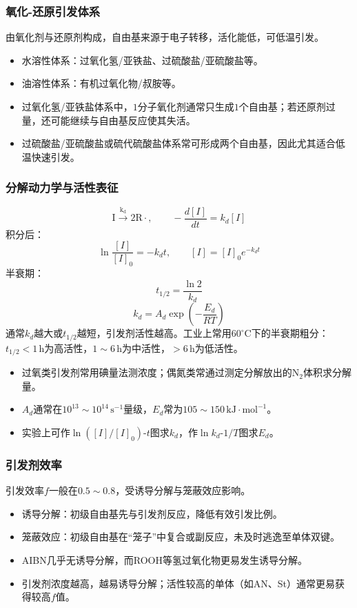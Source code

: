 ﻿\documentclass[12pt,a4paper]{article}
\begin{document}
\subsubsection{氧化-还原引发体系}
由氧化剂与还原剂构成，自由基来源于电子转移，活化能低，可低温引发。
\begin{itemize}
  \item 水溶性体系：过氧化氢/亚铁盐、过硫酸盐/亚硫酸盐等。
  \item 油溶性体系：有机过氧化物/叔胺等。
\end{itemize}
\begin{itemize}
  \item 过氧化氢/亚铁盐体系中，$1$分子氧化剂通常只生成$1$个自由基；若还原剂过量，还可能继续与自由基反应使其失活。
  \item 过硫酸盐/亚硫酸盐或硫代硫酸盐体系常可形成两个自由基，因此尤其适合低温快速引发。
\end{itemize}

\subsubsection{分解动力学与活性表征}
\[
\mathrm{I \xrightarrow{k_d} 2R\cdot},\qquad -\frac{d[I]}{dt}=k_d[I]
\]
积分后：
\[
\ln\frac{[I]}{[I]_0}=-k_dt,\qquad [I]=[I]_0e^{-k_dt}
\]
半衰期：
\[
t_{1/2}=\frac{\ln2}{k_d}
\]
\[
k_d=A_d\exp\!\left(-\frac{E_d}{RT}\right)
\]
通常$k_d$越大或$t_{1/2}$越短，引发剂活性越高。工业上常用$60^\circ\mathrm{C}$下的半衰期粗分：$t_{1/2}<1\,\mathrm{h}$为高活性，$1\sim6\,\mathrm{h}$为中活性，$>6\,\mathrm{h}$为低活性。
\begin{itemize}
  \item 过氧类引发剂常用碘量法测浓度；偶氮类常通过测定分解放出的$\mathrm{N_2}$体积求分解量。
  \item $A_d$通常在$10^{13}\sim10^{14}\,\mathrm{s^{-1}}$量级，$E_d$常为$105\sim150\,\mathrm{kJ\cdot mol^{-1}}$。
  \item 实验上可作$\ln([I]/[I]_0)$-$t$图求$k_d$，作$\ln k_d$-$1/T$图求$E_d$。
\end{itemize}

\subsubsection{引发剂效率}
引发效率$f$一般在$0.5\sim0.8$，受诱导分解与笼蔽效应影响。
\begin{itemize}
  \item 诱导分解：初级自由基先与引发剂反应，降低有效引发比例。
  \item 笼蔽效应：初级自由基在“笼子”中复合或副反应，未及时逃逸至单体双键。
  \item AIBN几乎无诱导分解，而ROOH等氢过氧化物更易发生诱导分解。
  \item 引发剂浓度越高，越易诱导分解；活性较高的单体（如AN、St）通常更易获得较高$f$值。
\end{itemize}
\end{document}
